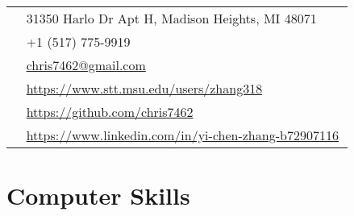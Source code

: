 \documentclass[10pt]{article} %
\begin{document}
\begin{paracol}{2}
  \parbox[top][0.12\textheight][c]{\linewidth}{ %
    \vspace{-0.04\textheight} %
    \colorbox{shade}{ %
      \begin{supertabular}{p{0.01\linewidth}|p{0.83\linewidth}} %
        \raisebox{-1pt}{\hspace{-2ex}\faHome} & 31350 Harlo Dr Apt H, Madison Heights, MI 48071\\ %
        \raisebox{-1pt}{\hspace{-2ex}\faPhone} & +1 (517) 775-9919 \\ %
        \raisebox{0pt}{\hspace{-2ex}\small\faEnvelope} & \href{mailto:chris7462@gmail.com}{chris7462@gmail.com} \\ %
        \raisebox{-1pt}{\hspace{-2ex}\small\faDesktop} & \href{https://www.stt.msu.edu/users/zhang318}{https://www.stt.msu.edu/users/zhang318} \\ %
        \raisebox{-1pt}{\hspace{-2ex}\faGithub} & \href{https://github.com/chris7462}{https://github.com/chris7462} \\ %
        \raisebox{-1pt}{\hspace{-2ex}\faLinkedinSquare} & \href{https://www.linkedin.com/in/yi-chen-zhang-b72907116}{https://www.linkedin.com/in/yi-chen-zhang-b72907116} \\ %
      \end{supertabular}
    }
  }


  \section{Computer Skills} 




\end{paracol}
\end{document}
